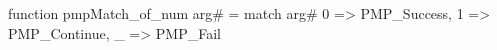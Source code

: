 function pmpMatch_of_num arg# = match arg# {
  0 => PMP_Success,
  1 => PMP_Continue,
  _ => PMP_Fail
}
